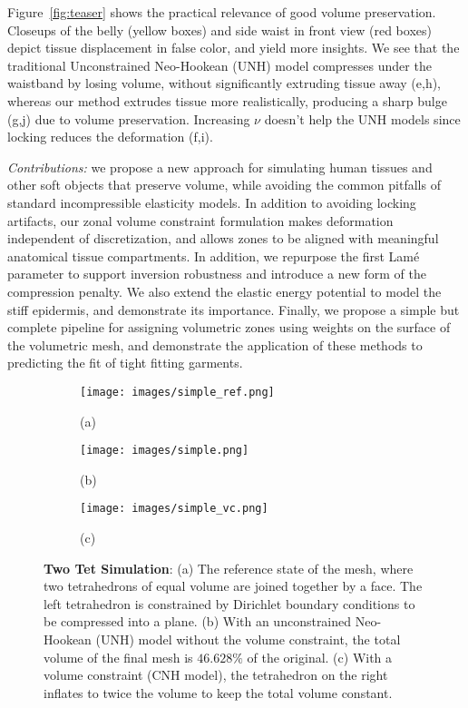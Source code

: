 Figure~\ref{fig:teaser} shows the practical relevance of good volume
preservation.  Closeups of the belly (yellow boxes) and side waist in
front view (red boxes) depict tissue displacement in false color, and
yield more insights. We see that the traditional Unconstrained
Neo-Hookean (UNH) model compresses under the waistband by losing volume,
without significantly extruding tissue away (e,h), whereas our method
extrudes tissue more realistically, producing a sharp bulge (g,j) due to
volume preservation.  Increasing $\nu$ doesn't help the UNH models since
locking reduces the deformation (f,i).

{\em Contributions:} we propose a new approach for simulating human
tissues and other soft objects that preserve volume, while avoiding
the common pitfalls of standard incompressible elasticity models. In
addition to avoiding locking artifacts, our zonal volume constraint
formulation makes deformation independent of discretization, and
allows zones to be aligned with meaningful anatomical tissue
compartments.  In addition, we repurpose the first Lam\'e parameter to
support inversion robustness and introduce a new form of the
compression penalty.  We also extend the elastic energy potential to
model the stiff epidermis, and demonstrate its importance.  Finally,
we propose a simple but complete pipeline for assigning volumetric
zones using weights on the surface of the volumetric mesh, and
demonstrate the application of these methods to predicting the fit of
tight fitting garments.

\begin{figure}[tb]
	\centering
	\begin{subfigure}{.32\linewidth}
		\centering
		\texttt{[image: images/simple\_ref.png]}
		\caption*{(a)}
		\label{sfig:simple_ref}
	\end{subfigure}%
	\begin{subfigure}{.32\linewidth}
		\centering
		\texttt{[image: images/simple.png]}
		\caption*{(b)}
		\label{sfig:simple}
	\end{subfigure}%
	\begin{subfigure}{.32\linewidth}
		\centering
		\texttt{[image: images/simple\_vc.png]}
		\caption*{(c)}
		\label{sfig:simple_vc}
	\end{subfigure}%
	\caption{\textbf{Two Tet Simulation}: (a) The reference state of the mesh, where two
		tetrahedrons of equal volume are joined together by a face. The left tetrahedron is constrained
		by Dirichlet boundary conditions to be compressed into a plane. 
		(b) With an unconstrained Neo-Hookean (UNH) model without the volume constraint, the total volume of the final mesh is $46.628\%$ of the original. 
		(c) With a volume constraint (CNH model), the tetrahedron on the right inflates to twice
		the volume to keep the total volume constant.
	}
	\label{fig:twotets}
\end{figure} 

